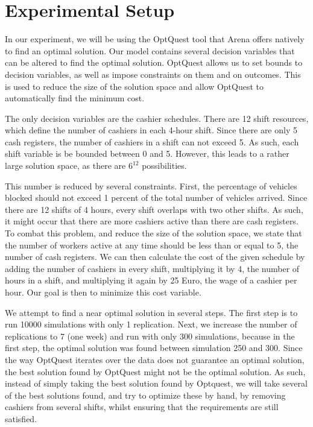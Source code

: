 \section{Experimental Setup}
In our experiment, we will be using the OptQuest tool that Arena offers natively to find an optimal solution.
Our model contains several decision variables that can be altered to find the optimal solution.
OptQuest allows us to set bounds to decision variables, as well as impose constraints on them and on outcomes.
This is used to reduce the size of the solution space and allow OptQuest to automatically find the minimum cost.

The only decision variables are the cashier schedules.
There are 12 shift resources, which define the number of cashiers in each 4-hour shift.
Since there are only 5 cash registers, the number of cashiers in a shift can not exceed 5.
As such, each shift variable is be bounded between 0 and 5.
However, this leads to a rather large solution space, as there are $6^{12}$ possibilities. 

This number is reduced by several constraints.
First, the percentage of vehicles blocked should not exceed 1 percent of the total number of vehicles arrived. 
Since there are 12 shifts of 4 hours, every shift overlaps with two other shifts.
As such, it might occur that there are more cashiers active than there are cash registers.
To combat this problem, and reduce the size of the solution space, we state that the number of workers active at any time should be less than or equal to 5, the number of cash registers. 
We can then calculate the cost of the given schedule by adding the number of cashiers in every shift, multiplying it by 4, the number of hours in a shift, and multiplying it again by 25 Euro, the wage of a cashier per hour.
Our goal is then to minimize this cost variable. 

We attempt to find a near optimal solution in several steps.
The first step is to run 10000 simulations with only 1 replication.
Next, we increase the number of replications to 7 (one week) and run with only 300 simulations, because in the first step, the optimal solution was found between simulation 250 and 300.
Since the way OptQuest iterates over the data does not guarantee an optimal solution, the best solution found by OptQuest might not be the optimal solution.
As such, instead of simply taking the best solution found by Optquest, we will take several of the best solutions found, and try to optimize these by hand, by removing cashiers from several shifts, whilst ensuring that the requirements are still satisfied. 
